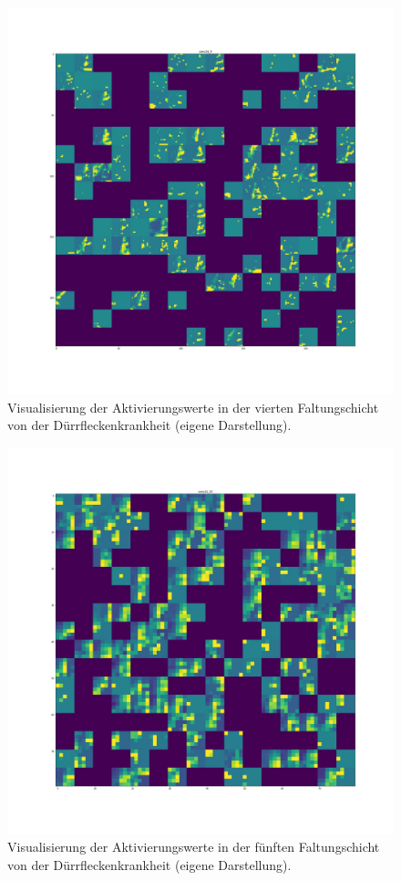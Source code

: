 \begin{figure}[h!]
	\centering
	\includegraphics[width=\textwidth]{visualisierungen/early/activation/early8.JPG}
	\caption{Visualisierung der Aktivierungswerte in der vierten Faltungschicht von der Dürrfleckenkrankheit (eigene Darstellung).}
	\label{early8_anhang}
\end{figure}

\begin{figure}[h!]
	\centering
	\includegraphics[width=\textwidth]{visualisierungen/early/activation/early10.JPG}
	\caption{Visualisierung der Aktivierungswerte in der fünften Faltungschicht von der Dürrfleckenkrankheit (eigene Darstellung).}
	\label{}
\end{figure}

